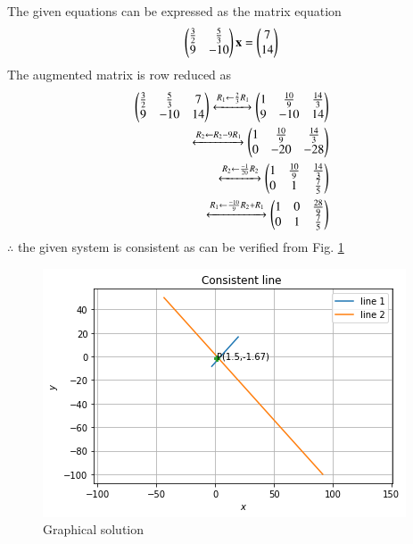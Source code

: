 
The given  equations can be expressed as the matrix equation
\begin{align}
     \begin{pmatrix}\frac{3}{2}&\frac{5}{3}\\9&-10\end{pmatrix}\mathbf{x}=\begin{pmatrix}7\\14\end{pmatrix}
\end{align}
The augmented matrix  is row reduced as
\begin{align}
     \begin{pmatrix}\frac{3}{2}&\frac{5}{3}& 7\\
           9 & -10 & 14\end{pmatrix}
          \xleftrightarrow{R_1 \leftarrow\frac{2}{3}{R_1}}
    \begin{pmatrix}1&\frac{10}{9}&\frac{14}{3}\\
        9&-10&14\end{pmatrix}\\
        \xleftrightarrow{R_2\leftarrow R_2 -9R_1}
    \begin{pmatrix}1&\frac{10}{9}&\frac{14}{3}\\0&-20&-28\end{pmatrix}\\
    \xleftrightarrow{R_2\leftarrow \frac{-1}{20}{R_2}}
    \begin{pmatrix}1&\frac{10}{9}&\frac{14}{3}\\0&1&\frac{7}{5}\end{pmatrix}\\
    \xleftrightarrow{R_1\leftarrow \frac{-10}{9}R_2+R_1}
    \begin{pmatrix}1&0&\frac{28}{9}\\0&1&\frac{7}{5}\end{pmatrix}
    \end{align}
   $\therefore$ the given system is consistent as can be verified from Fig. \ref{2/5/cFig:Graphical Solution}
\begin{figure}[!ht]
    \centering
    \includegraphics[width= \columnwidth]{solutions/sep/2/5/c/consistent line.png}
    \caption{Graphical solution}
    \label{2/5/cFig:Graphical Solution}
\end{figure}
  
